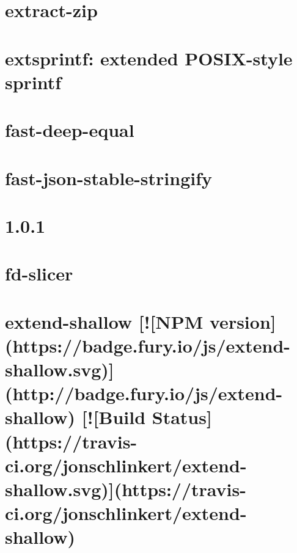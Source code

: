 \documentclass[twoside]{book}
\newcommand{\+}{\discretionary{\mbox{\scriptsize$\hookleftarrow$}}{}{}}
\begin{document}
\chapter{extract-\/zip}
\label{md_dsmacc_vis_degree_node_modules_extract-zip_readme}

\chapter{extsprintf\+: extended P\+O\+S\+I\+X-\/style sprintf}
\label{md_dsmacc_vis_degree_node_modules_extsprintf_README}

\chapter{fast-\/deep-\/equal}
\label{md_dsmacc_vis_degree_node_modules_fast-deep-equal_README}

\chapter{fast-\/json-\/stable-\/stringify}
\label{md_dsmacc_vis_degree_node_modules_fast-json-stable-stringify_README}

\chapter{1.0.1}
\label{md_dsmacc_vis_degree_node_modules_fd-slicer_CHANGELOG}

\chapter{fd-\/slicer}
\label{md_dsmacc_vis_degree_node_modules_fd-slicer_README}

\chapter{extend-\/shallow \mbox{[}!\mbox{[}N\+PM version\mbox{]}(https\+://badge.fury.\+io/js/extend-\/shallow.svg)\mbox{]}(http\+://badge.fury.\+io/js/extend-\/shallow) \mbox{[}!\mbox{[}Build Status\mbox{]}(https\+://travis-\/ci.org/jonschlinkert/extend-\/shallow.svg)\mbox{]}(https\+://travis-\/ci.org/jonschlinkert/extend-\/shallow)}
\label{md_dsmacc_vis_degree_node_modules_fill-range_node_modules_extend-shallow_README}

\end{document}
